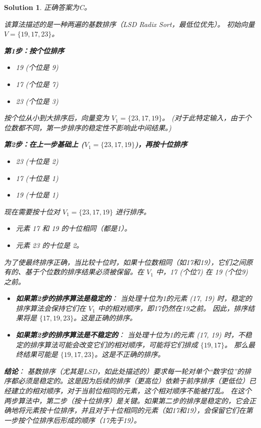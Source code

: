 \documentclass[UTF8]{report}
\newtheorem{solution}{Solution}
\theoremstyle{MyLineTheoremStyle} %
\theoremstyle{MyBlockTheoremStyle} %
\theoremstyle{MySubsubsectionStyle} %
\begin{document}
\begin{solution}
正确答案为C。

该算法描述的是一种两遍的基数排序（LSD Radix Sort，最低位优先）。
初始向量 $V = \{19, 17, 23\}$。

\textbf{第1步：按个位排序}
\begin{itemize}
    \item 19 (个位是 9)
    \item 17 (个位是 7)
    \item 23 (个位是 3)
\end{itemize}
按个位从小到大排序后，向量变为 $V_1 = \{23, 17, 19\}$。
(对于此特定输入，由于个位数都不同，第一步排序的稳定性不影响此中间结果。)

\textbf{第2步：在上一步基础上 ($V_1 = \{23, 17, 19\}$)，再按十位排序}
\begin{itemize}
    \item 23 (十位是 2)
    \item 17 (十位是 1)
    \item 19 (十位是 1)
\end{itemize}
现在需要按十位对 $V_1 = \{23, 17, 19\}$ 进行排序。
\begin{itemize}
    \item 元素 17 和 19 的十位相同（都是1）。
    \item 元素 23 的十位是 2。
\end{itemize}
为了使最终排序正确，当比较十位时，如果十位数相同（如17和19），它们之间原有的、基于个位数的排序结果必须被保留。在 $V_1$ 中，17 (个位7) 在 19 (个位9) 之前。
\begin{itemize}
    \item \textbf{如果第2步的排序算法是稳定的}：
    当处理十位为1的元素 (17, 19) 时，稳定的排序算法会保持它们在 $V_1$ 中的相对顺序，即17仍然在19之前。
    因此，排序结果将是 $\{17, 19, 23\}$。这是正确的排序。

    \item \textbf{如果第2步的排序算法是不稳定的}：
    当处理十位为1的元素 (17, 19) 时，不稳定的排序算法可能会改变它们的相对顺序，可能将它们排成 $\{19, 17\}$。
    那么最终结果可能是 $\{19, 17, 23\}$。这是不正确的排序。
\end{itemize}

\textbf{结论}：
基数排序（尤其是LSD，如此处描述的）要求每一轮对单个“数字位”的排序都必须是稳定的。这是因为后续的排序（更高位）依赖于前序排序（更低位）已经建立的相对顺序，对于当前位相同的元素，这个相对顺序不能被打乱。
在这个两步算法中，第二步（按十位排序）是关键。如果第二步的排序是稳定的，它会正确地将元素按十位排序，并且对于十位相同的元素（如17和19），会保留它们在第一步按个位排序后形成的顺序（17先于19）。


\end{solution}
\end{document}
